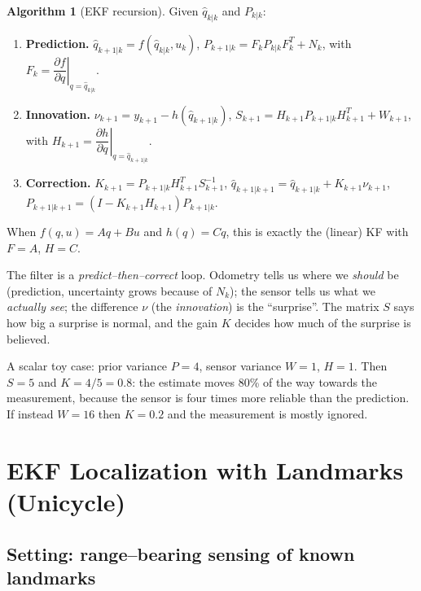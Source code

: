 \documentclass[11pt,a4paper]{article}
\def\bm#1{#1}%
\def\boldsymbol#1{#1}%
\newcommand{\hq}{\hat{\boldsymbol{q}}}
\newcommand{\slides}[1]{\texorpdfstring{\hspace{0.5em}{\normalfont\small\emph{(#1)}}}{}}
\theoremstyle{definition}
\newtheorem{algorithm}[definition]{Algorithm}
\theoremstyle{plain}
\theoremstyle{remark}
\begin{document}
\begin{algorithm}[EKF recursion]
\label{alg:ekf}
Given $\hq_{k|k}$ and $\bm P_{k|k}$:
\begin{enumerate}[label=\textbf{\arabic*.},leftmargin=1.6em]
  \item \textbf{Prediction.} $\hq_{k+1|k}=\bm f(\hq_{k|k},\bm u_k)$, \quad $\bm P_{k+1|k}=\bm F_k\bm P_{k|k}\bm F_k^T+\bm N_k$, \quad with $\bm F_k=\left.\dfrac{\partial\bm f}{\partial\bm q}\right|_{\bm q=\hq_{k|k}}$.
  \item \textbf{Innovation.} $\bm\nu_{k+1}=\bm y_{k+1}-\bm h(\hq_{k+1|k})$, \quad $\bm S_{k+1}=\bm H_{k+1}\bm P_{k+1|k}\bm H_{k+1}^T+\bm W_{k+1}$, \quad with $\bm H_{k+1}=\left.\dfrac{\partial\bm h}{\partial\bm q}\right|_{\bm q=\hq_{k+1|k}}$.
  \item \textbf{Correction.} $\bm K_{k+1}=\bm P_{k+1|k}\bm H_{k+1}^T\bm S_{k+1}^{-1}$, \quad $\hq_{k+1|k+1}=\hq_{k+1|k}+\bm K_{k+1}\bm\nu_{k+1}$, \quad $\bm P_{k+1|k+1}=(\bm I-\bm K_{k+1}\bm H_{k+1})\bm P_{k+1|k}$.
\end{enumerate}
When $\bm f(\bm q,\bm u)=\bm A\bm q+\bm B\bm u$ and $\bm h(\bm q)=\bm C\bm q$, this is exactly the (linear) KF with $\bm F=\bm A$, $\bm H=\bm C$.
\end{algorithm}

\begin{intuition}
The filter is a \emph{predict--then--correct} loop. Odometry tells us where we \emph{should} be (prediction, uncertainty grows because of $\bm N_k$); the sensor tells us what we \emph{actually see}; the difference $\bm\nu$ (the \emph{innovation}) is the ``surprise''. The matrix $\bm S$ says how big a surprise is normal, and the gain $\bm K$ decides how much of the surprise is believed.

A scalar toy case: prior variance $P=4$, sensor variance $W=1$, $H=1$. Then $S=5$ and $K=4/5=0.8$: the estimate moves 80\% of the way towards the measurement, because the sensor is four times more reliable than the prediction. If instead $W=16$ then $K=0.2$ and the measurement is mostly ignored.
\end{intuition}

\section{EKF Localization with Landmarks (Unicycle)}
\slides{slides 2--10}

\subsection{Setting: range--bearing sensing of known landmarks}
\slides{slides 2--4}
\end{document}
